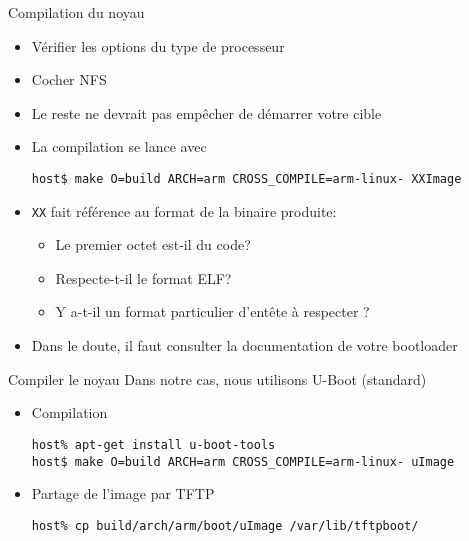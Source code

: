 \begin{frame}[fragile=singleslide]{Compilation du noyau}
  \begin{itemize}
  \item Vérifier les options du type de processeur
  \item Cocher NFS
  \item Le reste ne devrait pas empêcher de démarrer votre cible
  \item La compilation se lance avec
    \begin{lstlisting}
host$ make O=build ARCH=arm CROSS_COMPILE=arm-linux- XXImage
    \end{lstlisting}
  \item \verb+XX+ fait référence au format de la binaire produite:
    \begin{itemize}
    \item Le premier octet est-il du code?
    \item Respecte-t-il le format ELF?
    \item Y a-t-il un format particulier d'entête à respecter ?
    \end{itemize}
  \item Dans  le doute,  il faut consulter  la documentation  de votre
    bootloader
  \end{itemize}
\end{frame}

\begin{frame}[fragile=singleslide]{Compiler le noyau}
  Dans notre cas, nous utilisons U-Boot (standard)
  \begin{itemize}
  \item Compilation
    \begin{lstlisting}
host% apt-get install u-boot-tools
host$ make O=build ARCH=arm CROSS_COMPILE=arm-linux- uImage
    \end{lstlisting}
  \item Partage de l'image par TFTP
    \begin{lstlisting}
host% cp build/arch/arm/boot/uImage /var/lib/tftpboot/
    \end{lstlisting} %
  \end{itemize}
\end{frame}

